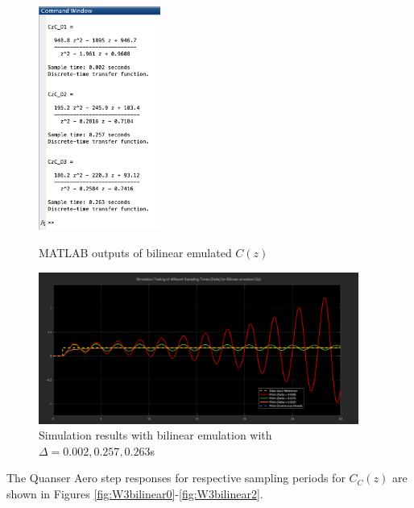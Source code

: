 \documentclass[11pt]{article}
\begin{document}
\begin{figure}[H]
\begin{minipage}{.3\textwidth}
    \centering
    \includegraphics[width=4cm]{W3_CzC_DTFs.png}
    \caption{MATLAB outputs of bilinear emulated $C(z)$}
    \label{fig:CzC_DTFs}
\end{minipage}
\hspace{1cm}
\begin{minipage}{.6\textwidth}
    \centering
    \includegraphics[width=10.5cm]{W3_CzC_DSim.png}
    \caption{Simulation results with bilinear emulation with $\Delta = 0.002, 0.257, 0.263$s}
    \label{fig:CzC_DSim}
\end{minipage}
\end{figure}

The Quanser Aero step responses for respective sampling periods for $C_C(z)$ are shown in Figures \ref{fig:W3bilinear0}-\ref{fig:W3bilinear2}.
\end{document}
